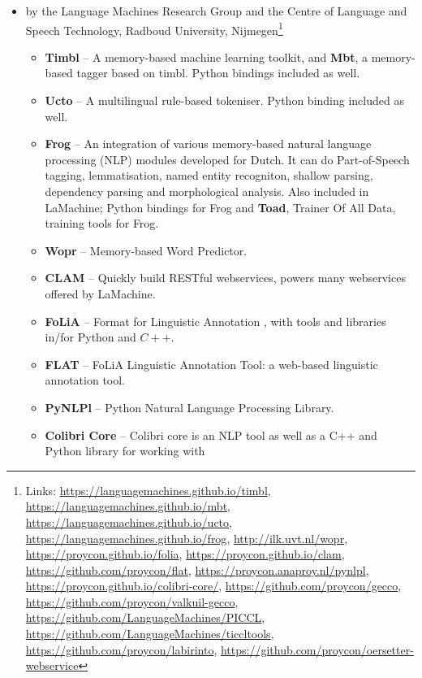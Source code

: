 \documentclass[a4paper,11pt]{article}
\begin{document}
\begin{itemize}
 \item by the Language Machines Research Group and the Centre of Language and Speech Technology, Radboud University,
     Nijmegen\footnote{Links: \url{https://languagemachines.github.io/timbl}, \url{https://languagemachines.github.io/mbt},
    \url{https://languagemachines.github.io/ucto}, \url{https://languagemachines.github.io/frog},
    \url{http://ilk.uvt.nl/wopr}, \url{https://proycon.github.io/folia}, \url{https://proycon.github.io/clam},
\url{https://github.com/proycon/flat}, \url{https://proycon.anaproy.nl/pynlpl},
\url{https://proycon.github.io/colibri-core/},
\url{https://github.com/proycon/gecco},
\url{https://github.com/proycon/valkuil-gecco},
\url{https://github.com/LanguageMachines/PICCL}, \url{https://github.com/LanguageMachines/ticcltools},
\url{https://github.com/proycon/labirinto},
\url{https://github.com/proycon/oersetter-webservice}
}
 \begin{itemize}
     \item \textbf{Timbl} -- A memory-based machine learning
         toolkit, and \textbf{Mbt}, a memory-based tagger based on timbl. Python bindings included as well.
     \item \textbf{Ucto} -- A multilingual rule-based tokeniser. Python binding included as well.
     \item \textbf{Frog} -- An integration of various memory-based natural language processing (NLP) modules
         developed for Dutch. It can do Part-of-Speech tagging, lemmatisation, named entity recogniton, shallow parsing,
         dependency parsing and morphological analysis. Also included in LaMachine;
         Python bindings for Frog and \textbf{Toad}, Trainer Of All Data, training tools for Frog.
     \item \textbf{Wopr} -- Memory-based Word Predictor.
     \item \textbf{CLAM} -- Quickly build RESTful webservices, powers many webservices offered by LaMachine.
     \item \textbf{FoLiA} -- Format for Linguistic Annotation \cite{FOLIAPAPER}, with tools and libraries in/for Python and $C++$.
     \item \textbf{FLAT} -- FoLiA Linguistic Annotation Tool: a web-based linguistic annotation tool.
     \item \textbf{PyNLPl} -- Python Natural Language Processing Library.
     \item \textbf{Colibri Core} -- Colibri core is an NLP tool as well as a C++ and Python library for working with

\end{itemize}
\end{itemize}
\end{document}
